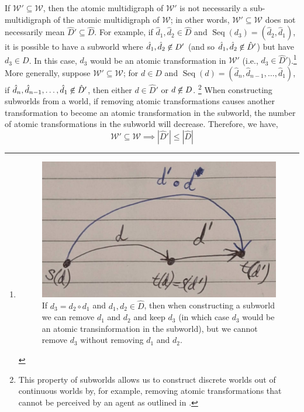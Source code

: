 If $\mathscr{W}' \subseteq \mathscr{W}$, then the atomic multidigraph of $\mathscr{W}'$ is not necessarily a sub-multidigraph of the atomic multidigraph of $\mathscr{W}$; in other words, $\mathscr{W}' \subseteq \mathscr{W}$ does not necessarily mean $\hat{D}' \subseteq \hat{D}$. For example, if $\hat{d}_{1}, \hat{d}_{2} \in \hat{D}$ and $\operatorname{Seq}(d_{3}) = (\hat{d}_{2}, \hat{d}_{1})$, it is possible to have a subworld where $\hat{d}_{1}, \hat{d}_{2} \centernot\in D'$ (and so $\hat{d}_{1}, \hat{d}_{2} \centernot\in \hat{D}'$) but have $d_{3} \in D$.
In this case, $d_{3}$ would be an atomic transformation in $\mathscr{W}'$ (i.e., $d_{3} \in \hat{D}'$).\footnote{
\begin{figure}[H]
    \includegraphics[width=0.5\linewidth]{2MathematicalFramework/Images/transformation_composition.jpg}
    \caption{
    If $d_{3} = d_{2} \circ d_{1}$ and $d_{1}, d_{2} \in \hat{D}$, then when constructing a subworld we can remove $d_{1}$ and $d_{2}$ and keep $d_{3}$ (in which case $d_{3}$ would be an atomic transinformation in the subworld), but we cannot remove $d_{3}$ without removing $d_{1}$ and $d_{2}$.
    }
\end{figure}
}
More generally, suppose $\mathscr{W}' \subseteq \mathscr{W}$; for $d \in D$ and $\operatorname{Seq}(d) = (\hat{d}_{n}, \hat{d}_{n-1}, \dots, \hat{d}_{1})$, if $\hat{d}_{n}, \hat{d}_{n-1}, \dots, \hat{d}_{1} \centernot\in \hat{D}'$, then either $d \in \hat{D}'$ or $d \centernot\in D$.
\footnote{
This property of subworlds allows us to construct discrete worlds out of continuous worlds by, for example, removing atomic transformations that cannot be perceived by an agent as outlined in 
.
}
When constructing subworlds from a world, if removing atomic transformations causes another transformation to become an atomic transformation in the subworld, the number of atomic transformations in the subworld will decrease.
Therefore, we have,
\begin{equation}
    \mathscr{W}' \subseteq \mathscr{W} \implies |\hat{D}'| \leq |\hat{D}|
\end{equation}


